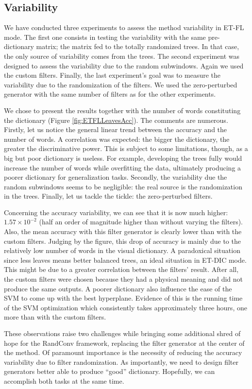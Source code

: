 \documentclass[a4paper]{report}
\begin{document}
	
	\subsection{Variability}
	We have conducted three experiments to assess the method variability in ET-FL mode. The first one consists in testing the variability with the same pre-dictionary matrix; the matrix fed to the totally randomized trees. In that case, the only source of variability comes from the trees. The second experiment was designed to assess the variability due to the random subwindows. Again we used the custom filters. Finally, the last experiment's goal was to measure the variability due to the randomization of the filters. We used the zero-perturbed generator with the same number of filters as for the other experiments.
	\par
	We chose to present the results together with the number of words constituting the dictionary (Figure \ref{fig:ETFLLeavesAcc}). The comments are numerous. Firstly, let us notice the general linear trend between the accuracy and the number of words. A correlation was expected: the bigger the dictionary, the greater the discriminative power. This is subject to some limitations, though, as a big but poor dictionary is useless. For example, developing the trees fully would increase the number of words while overfitting the data, ultimately producing a poorer dictionary for generalization tasks. Secondly, the variability due the random subwindows seems to be negligible: the real source is the randomization in the trees. Finally, let us tackle the tickle: the zero-perturbed filters. 
	\par
	Concerning the accuracy variability, we can see that it is now much higher: $1.57 \times 10^{-2}$ (half an order of magnitude higher than without varying the filters). Also, the mean accuracy with this filter generator is clearly lower than with the custom filters. Judging by the figure, this drop of accuracy is mainly due to the relatively low number of words in the visual dictionary. A paradoxical situation since less leaves means better balanced trees, an ideal situation in ET-DIC mode. This might be due to a greater correlation between the filters' result. After all, the custom filters were chosen because they had a physical meaning and did not produce the same outputs.
	A poorer dictionary also influence the ease of the SVM to come up with the best hyperplane. Evidence of this is the running time of the SVM optimization which consistently takes approximately three hours, one more than with the custom filters.
	\par
	These observations raise two challenges while bringing some additional shred of hope for the RandConv framework, replacing the filter generator at the center of the method. Of paramount importance is the necessity of reducing the accuracy variability due to filter randomization. As importantly, we need to design filter generators better able to produce ``good'' dictionary. Hopefully, we can accomplish both tasks at the same time.
	
\end{document}
